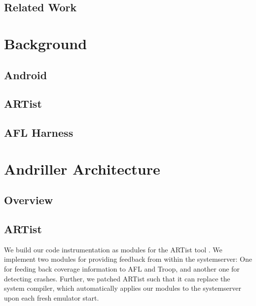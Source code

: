 \documentclass[runningheads]{llncs}
\begin{document}
\subsection{Related Work} %
\section{Background}
\subsection{Android}
\subsection{ARTist}
\subsection{AFL Harness}
\section{Andriller Architecture}

\subsection{Overview} %
\subsection{ARTist}
We build our code instrumentation as modules for the ARTist tool \cite{artist}. We implement two modules for providing feedback from within the systemserver: One for feeding back coverage information to AFL and Troop, and another one for detecting crashes. Further, we patched ARTist such that it can replace the system compiler, which automatically applies our modules to the systemserver upon each fresh emulator start.
\end{document}
